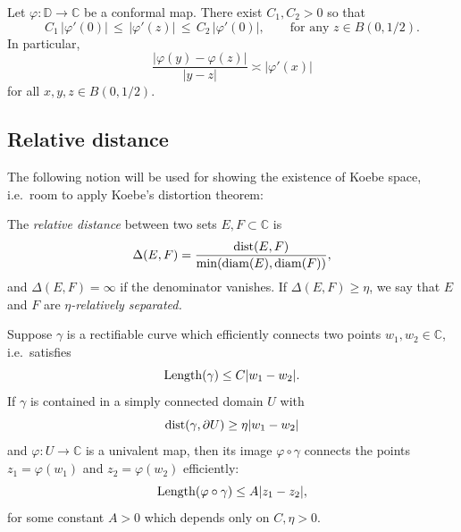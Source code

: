 \begin{theorem} 
\label{koebe}
Let $\varphi: \mathbb{D} \to \mathbb{C}$ be a conformal map. There exist $C_1, C_2 > 0$ so that
$$
C_1 \, |\varphi'(0)| \, \le \, |\varphi'(z)| \, \le \, C_2 \, |\varphi'(0)|, \qquad \text{for any }z \in B(0,1/2).
$$
In particular,
	\begin{equation}
		\frac {|\varphi(y)-\varphi(z)|}{|y-z|} \asymp |\varphi'(x)|
	\end{equation}
	for all $x,y,z \in B(0,1/2)$.
\end{theorem}



\subsection{Relative distance}

The following notion will be used for showing the existence of Koebe space, i.e.~room to apply Koebe's distortion theorem:
\begin{definition}
	The \emph{relative distance} between two sets $E,F \subset \mathbb C$ is 
	\begin{equation}
		\Delta(E,F) = \frac{\operatorname{dist}(E,F)}{\min(\operatorname{diam}(E), \operatorname{diam}(F))},	
	\end{equation}
	and $\Delta(E,F) = \infty$ if the denominator vanishes.
	If $\Delta(E,F) \geq \eta$, we say that $E$ and $F$ are 
	\emph{$\eta$-relatively separated.}
\end{definition}

\begin{lemma}
\label{koebe-quasiconvexity}
Suppose $\gamma$ is a rectifiable curve  which efficiently connects two points $w_1, w_2 \in \mathbb{C}$, i.e.~satisfies
$$\operatorname{Length}(\gamma) \le C |w_1 - w_2|.
$$
If $\gamma$ is contained in a simply connected domain $U$ with
$$
\operatorname{dist}(\gamma, \partial U) \ge \eta |w_1 - w_2|
$$
and $\varphi: U \to \mathbb{C}$ is a univalent map, then its image
$\varphi \circ \gamma$ connects the points  $z_1 = \varphi(w_1)$ and $z_2 = \varphi(w_2)$ efficiently:
$$
\operatorname{Length}(\varphi \circ \gamma) \le A |z_1 - z_2|,
$$
for some constant $A > 0$ which depends only on $C, \eta > 0$.
\end{lemma}

